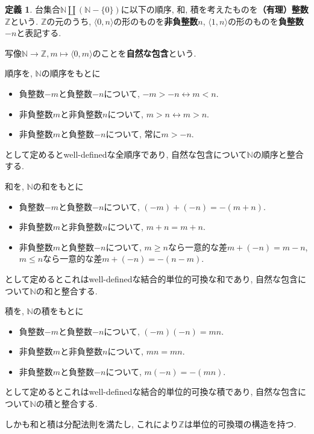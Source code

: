 \documentclass[a4paper, twoside]{bxjsarticle}
\newcommand{\nat}{\mathbb{N}}
\newcommand{\zah}{\mathbb{Z}}
\theoremstyle{definition}
\newtheorem{defn}[thm]{定義}
\begin{document}
        \begin{defn}
            台集合$\nat\coprod(\nat-\{0\})$に以下の順序, 和, 積を考えたものを\textbf{（有理）整数}$\zah$という. $\zah$の元のうち, $\langle 0, n\rangle$の形のものを\textbf{非負整数}$n$, $\langle 1, n\rangle$の形のものを\textbf{負整数}$-n$と表記する.
            
            写像$\nat\to\zah, m\mapsto \langle 0, m\rangle$のことを\textbf{自然な包含}という. 
            
            順序を, $\nat$の順序をもとに
            \begin{itemize}
                \item 負整数$-m$と負整数$-n$について, $-m>-n \leftrightarrow m<n$.
                \item 非負整数$m$と非負整数$n$について, $m>n \leftrightarrow m>n$.
                \item 非負整数$m$と負整数$-n$について, 常に$m>-n$.
            \end{itemize}
            として定めるとwell-definedな全順序であり, 自然な包含について$\nat$の順序と整合する.
            
            和を, $\nat$の和をもとに
            \begin{itemize}
                \item 負整数$-m$と負整数$-n$について, $(-m)+(-n)=-(m+n)$.
                \item 非負整数$m$と非負整数$n$について, $m+n=m+n$.
                \item 非負整数$m$と負整数$-n$について, $m\geq n$なら一意的な差$m+(-n)=m-n$, $m\leq n$なら一意的な差$m+(-n)=-(n-m)$.
            \end{itemize}
            として定めるとこれはwell-definedな結合的単位的可換な和であり, 自然な包含について$\nat$の和と整合する.
            
            積を, $\nat$の積をもとに
            \begin{itemize}
                \item 負整数$-m$と負整数$-n$について, $(-m)(-n)=mn$.
                \item 非負整数$m$と非負整数$n$について, $mn=mn$.
                \item 非負整数$m$と負整数$-n$について, $m(-n)=-(mn)$.
            \end{itemize}
            として定めるとこれはwell-definedな結合的単位的可換な積であり, 自然な包含について$\nat$の積と整合する.
            
            しかも和と積は分配法則を満たし, これにより$\zah$は単位的可換環の構造を持つ.
        \end{defn}
\end{document}
